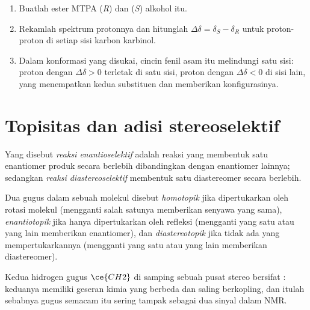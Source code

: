 \begin{method}\label{met:b3:asymmetric-synthesis:mosher}
\begin{enumerate}
  \item Buatlah ester MTPA (\textit{R}) dan (\textit{S}) alkohol itu.
  \item Rekamlah spektrum protonnya dan hitunglah $\Delta\delta = \delta_S - \delta_R$ untuk proton-proton di setiap
        sisi karbon karbinol.
  \item Dalam konformasi yang disukai, cincin fenil asam itu melindungi satu sisi:
        proton dengan $\Delta\delta > 0$ terletak di satu sisi, proton dengan $\Delta\delta < 0$ di sisi lain, yang
        menempatkan kedua substituen dan memberikan konfigurasinya.
\end{enumerate}
\end{method}

\section{Topisitas dan adisi stereoselektif}

\begin{definition}\label{def:b3:asymmetric-synthesis:selective}
Yang disebut \emph{reaksi enantioselektif} adalah reaksi yang membentuk satu
enantiomer produk secara berlebih dibandingkan dengan enantiomer lainnya; sedangkan \emph{reaksi
diastereoselektif} membentuk satu diastereomer secara berlebih.
\end{definition}

\begin{definition}[Topisitas]\label{def:b3:asymmetric-synthesis:topicity}
Dua gugus dalam sebuah molekul disebut \emph{homotopik} jika dipertukarkan oleh
rotasi molekul (mengganti salah satunya memberikan senyawa yang sama),
\emph{enantiotopik} jika hanya dipertukarkan oleh refleksi
(mengganti yang satu atau yang lain memberikan enantiomer), dan
\emph{diastereotopik} jika tidak ada  yang mempertukarkannya
(mengganti yang satu atau yang lain memberikan diastereomer).
\end{definition}

Kedua hidrogen gugus $\ce{CH2}$ di samping sebuah pusat stereo bersifat : keduanya
memiliki geseran kimia yang berbeda dan saling berkopling, dan itulah sebabnya gugus semacam itu
sering tampak sebagai dua sinyal dalam NMR.

